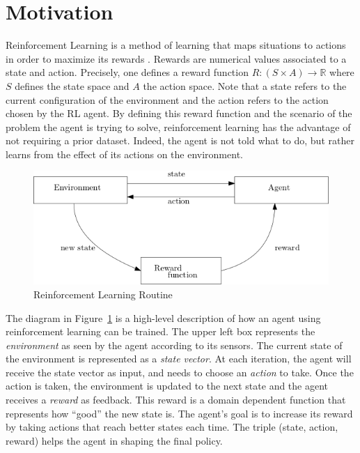\section{Motivation} 

Reinforcement Learning is a method of learning that maps situations to
actions in order to maximize its rewards
\cite{sutton2018reinforcement}. Rewards are numerical values
associated to a state and action. Precisely, one defines a reward
function 
$R : (S \times A) \rightarrow \mathbb{R}$ where $S$ defines the state space and $A$ the action space. Note that a state refers to the current configuration
of the environment and the action refers to the action chosen by the RL agent. By defining this reward function and the scenario of the problem the agent is trying to solve, 
reinforcement learning has the advantage of not requiring a prior dataset. Indeed, the agent is not told what to do, but rather 
learns from the effect of its actions on the environment. 

\begin{figure}[H]
  \centering
  \includegraphics[scale=0.4]{figures/rlroutine.png}
  \caption{Reinforcement Learning Routine}
  \label{fig:rl}
\end{figure}


The diagram in Figure~\ref{fig:rl} is a high-level description of how
an agent using reinforcement learning can be trained.  
%
The upper left box represents the \emph{environment} as seen by the agent
according to its sensors.
%
The current state of the environment is represented as a \emph{state
vector}.
%
At each iteration, the agent will receive the state vector as input,
and needs to choose an \emph{action} to take.
%
Once the action is taken, the environment is updated to the next state
and the agent receives a \emph{reward} as feedback.
%
This reward is a domain dependent function that represents how
``good'' the new state is.
%
The agent's goal is to increase its reward by taking actions that
reach better states each time.
%
The triple (state, action, reward) helps the agent in shaping the
final policy.

